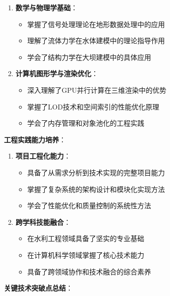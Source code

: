 \begin{enumerate}
\def\labelenumi{\arabic{enumi}.}
\setcounter{enumi}{4}
\tightlist
\item
  \textbf{数学与物理学基础}：

  \begin{itemize}
  \tightlist
  \item
    掌握了信号处理理论在地形数据处理中的应用
  \item
    理解了流体力学在水体建模中的理论指导作用
  \item
    学会了结构力学在大坝建模中的具体应用
  \end{itemize}
\item
  \textbf{计算机图形学与渲染优化}：

  \begin{itemize}
  \tightlist
  \item
    深入理解了GPU并行计算在三维渲染中的优势
  \item
    掌握了LOD技术和空间索引的性能优化原理
  \item
    学会了内存管理和对象池化的工程实践
  \end{itemize}
\end{enumerate}

\textbf{工程实践能力培养}：

\begin{enumerate}
\def\labelenumi{\arabic{enumi}.}
\setcounter{enumi}{6}
\tightlist
\item
  \textbf{项目工程化能力}：

  \begin{itemize}
  \tightlist
  \item
    具备了从需求分析到技术实现的完整项目能力
  \item
    掌握了复杂系统的架构设计和模块化实现方法
  \item
    学会了性能优化和质量控制的系统性方法
  \end{itemize}
\item
  \textbf{跨学科技能融合}：

  \begin{itemize}
  \tightlist
  \item
    在水利工程领域具备了坚实的专业基础
  \item
    在计算机科学领域掌握了核心技术能力
  \item
    具备了跨领域协作和技术融合的综合素养
  \end{itemize}
\end{enumerate}

\textbf{关键技术突破点总结}：

